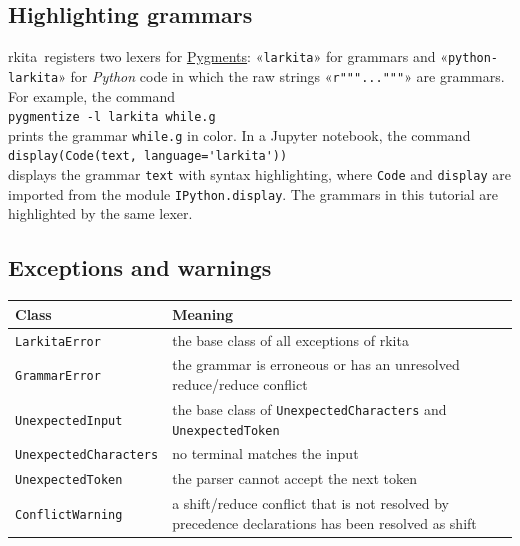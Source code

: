 \documentclass[11pt,a4paper]{article}
\makeatletter
\newcommand{\fakesc}[1]{\resizebox{!}{0.99ex}{\textls[90]{\MakeUppercase{#1}}}}
\def\@simtextsc#1#2\@nil{\MakeUppercase{#1}\fakesc{#2}}
\newcommand{\simtextsc}[1]{%
  \ifmmode\text{\@simtextsc#1\@nil}\else\@simtextsc#1\@nil\fi}
\newcommand{\Larkita}{\simtextsc{Larkita}}
\makeatother
\begin{document}
\subsection{Highlighting grammars}
\Larkita\ registers two lexers for \href{https://pygments.org}{Pygments}:  «\verb|larkita|» for grammars and
«\verb|python-larkita|» for \textsl{Python} code in which the raw strings «\verb|r"""..."""|» are grammars.  For
example, the command
\\[0.2cm]
\hspace*{1.3cm}
\verb|pygmentize -l larkita while.g|
\\[0.2cm]
prints the grammar \texttt{while.g} in color.  In a Jupyter notebook, the command
\\[0.2cm]
\hspace*{1.3cm}
\verb|display(Code(text, language='larkita'))|
\\[0.2cm]
displays the grammar \texttt{text} with syntax highlighting, where \texttt{Code} and \texttt{display} are imported
from the module \texttt{IPython.display}.  The grammars in this tutorial are highlighted by the same lexer.

\subsection{Exceptions and warnings}
\begin{center}
\begin{tabular}{l>{\raggedright\arraybackslash}p{11cm}}
\toprule
\textbf{Class}                  & \textbf{Meaning} \\
\midrule
\texttt{LarkitaError}           & the base class of all exceptions of \Larkita \\
\texttt{GrammarError}           & the grammar is erroneous or has an unresolved reduce/reduce conflict \\
\texttt{UnexpectedInput}        & the base class of \texttt{UnexpectedCharacters} and \texttt{UnexpectedToken} \\
\texttt{UnexpectedCharacters}   & no terminal matches the input \\
\texttt{UnexpectedToken}        & the parser cannot accept the next token \\
\texttt{ConflictWarning}        & a shift/reduce conflict that is not resolved by precedence declarations has
                                  been resolved as shift \\
\bottomrule
\end{tabular}
\end{center}
\end{document}
